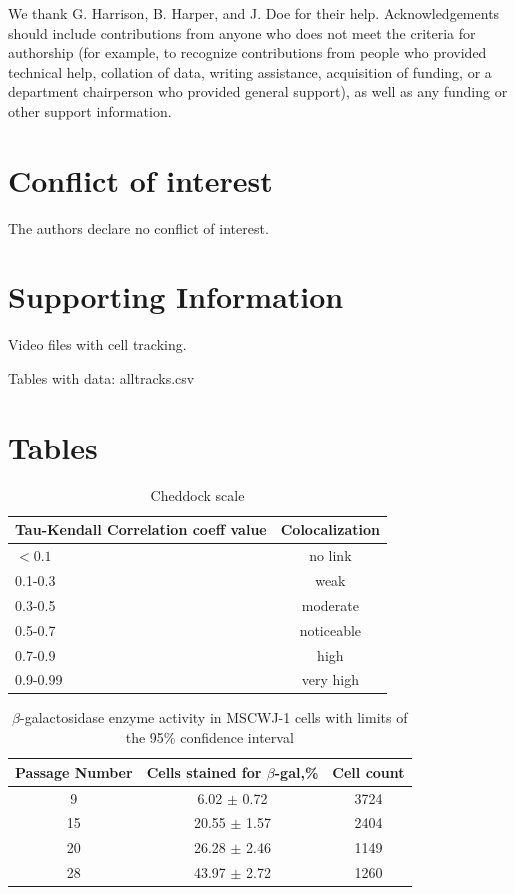\documentclass[alpha-refs]{wiley-article}
\begin{document}
We thank G. Harrison, B. Harper, and J. Doe for their help.
Acknowledgements should include contributions from anyone who does not meet the criteria for authorship (for example, to recognize contributions from people who provided technical help, collation of data, writing assistance, acquisition of funding, or a department chairperson who provided general support), as well as any funding or other support information.

\section*{Conflict of interest}
The authors declare no conflict of interest.





\section*{Supporting Information}

Video files with cell tracking.

Tables with data:
alltracks.csv

\section*{Tables}

\begin{table}[hbt!]
  \caption{Cheddock scale}
  \label{cheddock}
\centering
\begin{tabular}{l|c|}
  Tau-Kendall Correlation coeff value & Colocalization \\
 \hline
 $ <0.1 $ & no link \\
 0.1-0.3 & weak \\
 0.3-0.5 & moderate \\
 0.5-0.7 & noticeable \\
 0.7-0.9 & high \\
 0.9-0.99 & very high
\end{tabular}
\end{table}


\begin{table}[hbt!]
  \caption{$\beta$-galactosidase enzyme activity in MSCWJ-1 cells with limits of the 95\% confidence interval}
  \label{tab}
\centering
\begin{tabular}{c|c|c}
 Passage Number & Cells stained for $\beta$-gal,\% & Cell count  \\
 \hline
 9 & 6.02 $\pm$ 0.72 & 3724 \\
 15 & 20.55 $\pm$ 1.57 & 2404 \\
 20 & 26.28 $\pm$ 2.46 & 1149  \\
 28 & 43.97 $\pm$ 2.72 & 1260
\end{tabular}
\end{table}
\end{document}
